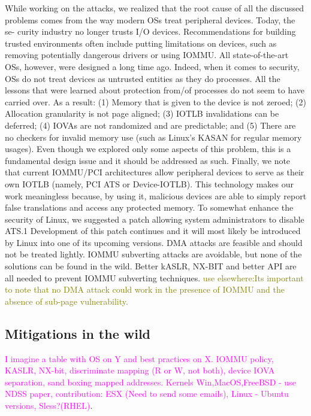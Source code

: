 While working on the attacks, we realized that the root cause of all the discussed problems comes from the way modern OSs treat peripheral devices. Today, the se- curity industry no longer trusts I/O devices. Recommendations for building trusted environments often include putting limitations on devices, such as removing potentially dangerous drivers or using IOMMU. All state-of-the-art OSs, however, were designed a long time ago. Indeed, when it comes to security, OSs do not treat devices as untrusted entities as they do processes. All the lessons that were learned about protection from/of processes do not seem to have carried over. As a result: (1) Memory that is given to the device is not zeroed; (2) Allocation granularity is not page aligned; (3) IOTLB invalidations can be deferred; (4) IOVAs are not randomized and are predictable; and (5) There are no checkers for invalid memory use (such as Linux’s KASAN for regular memory usages). Even though we explored only some aspects of this problem, this is a fundamental design issue and it should be addressed as such. Finally, we note that current IOMMU/PCI architectures allow peripheral devices to serve as their own IOTLB (namely, PCI ATS or Device-IOTLB). This technology makes our work meaningless because, by using it, malicious devices are able to simply report false translations and access any protected memory. To somewhat enhance the security of Linux, we suggested a patch allowing system administrators to disable ATS.1 Development of this patch continues and it will most likely be introduced by Linux into one of its upcoming versions.\newline
DMA attacks are feasible and should not be treated lightly. IOMMU subverting attacks are avoidable, but none of the solutions can be found in the wild. Better kASLR, NX-BIT and better API are all needed to prevent IOMMU subverting techniques. 
\textcolor{olive}{use elsewhere:Its important to note that no DMA attack could work in the presence of IOMMU and the absence of sub-page vulnerability.}

\subsection{Mitigations in the wild}
\textcolor{magenta}{I imagine a table with OS on Y and best practices on X.
IOMMU policy, KASLR, NX-bit, discriminate mapping (R or W, not both), device IOVA separation, sand boxing mapped addresses.
Kernels Win,MacOS,FreeBSD - use NDSS paper, contribution: ESX (Need to send some emails), Linux - Ubuntu versions, Sless?(RHEL)}.